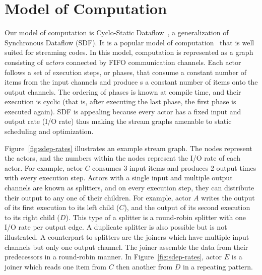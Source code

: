 \newcommand{\la}{$\leftarrow$}
\newcommand{\IND}{\begin{ALC@g}}
\newcommand{\UND}{\end{ALC@g}}
\newcommand{\tup}[2]{\langle{#1}, {#2}\rangle}

\section{Model of Computation}


Our model of computation is Cyclo-Static Dataflow~\cite{BELP96},
a generalization of Synchronous Dataflow (SDF). It  is a popular  model of
computation~\cite{LM87-i} that  is well suited for  streaming
codes. In this model, computation is represented  as a graph consisting of
{\it  actors} connected by FIFO communication channels.
Each actor follows a set of execution steps, or phases, that consume
a constant number of items from the input channels and produce s a
constant number of items onto the
output channels.  
The  ordering of phases is known at
compile time, and their execution is cyclic (that is, after executing
the last phase, the first phase is executed again).
SDF is appealing because every actor has a fixed input and output rate
(I/O rate) thus making the stream graphs  amenable to static
scheduling and optimization.

Figure~\ref{fig:sdep-rates} illustrates an example stream graph. The
nodes represent the actors, and the numbers within the nodes represent
the I/O rate of each actor. For example, actor $C$  consumes 3 input
items and produces 2 output times with every execution step. Actors
with a single input and multiple output channels are known as splitters, and on
every execution step, they can distribute their output to any one of
their children. For example, actor $A$ writes the output of its first
execution to its left child ($C$), and the output of its second
execution to its right child ($D$). This type of a splitter is a
round-robin splitter with one I/O rate per output edge. A duplicate
splitter is also possible but is not illustrated. A counterpart to splitters
are the joiners which have multiple input channels but only one output
channel. The joiner assemble the data from their predecessors
in a round-robin manner. In Figure~\ref{fig:sdep-rates}, actor $E$ is
a joiner which reads one item from $C$ then another from $D$ in a
repeating pattern. 

